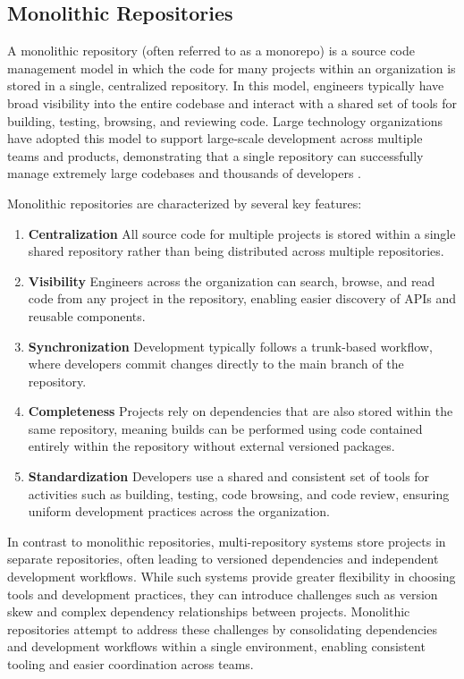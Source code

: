 \subsection{Monolithic Repositories}

A monolithic repository (often referred to as a monorepo) is a source code management model in which the code for many projects within an organization is stored in a single, centralized repository. In this model, engineers typically have broad visibility into the entire codebase and interact with a shared set of tools for building, testing, browsing, and reviewing code. Large technology organizations have adopted this model to support large-scale development across multiple teams and products, demonstrating that a single repository can successfully manage extremely large codebases and thousands of developers \cite{potvin2016google}.

Monolithic repositories are characterized by several key features:
\begin{enumerate}
    \item \textbf{Centralization} All source code for multiple projects is stored within a single shared repository rather than being distributed across multiple repositories.
    \item \textbf{Visibility} Engineers across the organization can search, browse, and read code from any project in the repository, enabling easier discovery of APIs and reusable components.
    \item \textbf{Synchronization} Development typically follows a trunk-based workflow, where developers commit changes directly to the main branch of the repository.
    \item \textbf{Completeness} Projects rely on dependencies that are also stored within the same repository, meaning builds can be performed using code contained entirely within the repository without external versioned packages.
    \item \textbf{Standardization} Developers use a shared and consistent set of tools for activities such as building, testing, code browsing, and code review, ensuring uniform development practices across the organization.
\end{enumerate}

In contrast to monolithic repositories, multi-repository systems store projects in separate repositories, often leading to versioned dependencies and independent development workflows. While such systems provide greater flexibility in choosing tools and development practices, they can introduce challenges such as version skew and complex dependency relationships between projects. Monolithic repositories attempt to address these challenges by consolidating dependencies and development workflows within a single environment, enabling consistent tooling and easier coordination across teams.

